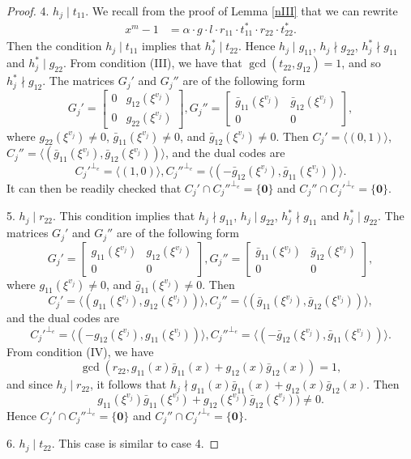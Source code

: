\documentclass[10pt,a4paper]{amsart}
\begin{document}
\begin{proof}
4. $h_j \mid t_{11}$. We recall from the proof of Lemma \ref{nIII} that we can  rewrite 
\begin{align*}
x^m-1   &= \alpha \cdot g \cdot l \cdot r_{11} \cdot t_{11}^*    \cdot  r_{22} \cdot  t_{22}^*.
\end{align*}  
Then the condition $h_j \mid t_{11}$   implies that $h_j^* \mid t_{22}$. Hence $h_j \mid g_{11}$, $h_j \nmid g_{22}$, $h_j^* \nmid g_{11}$ and $h_j^* \mid g_{22}$.  
From condition (III), we have that $\gcd(t_{22},g_{12})=1$, and so $h_j^* \nmid g_{12}$.  
The matrices $G_j'$ and  $G_j''$ are of the following form
$$
G_j'=   \begin{bmatrix}
0 & g_{12}(\xi^{v_j}) \\
0 & g_{22}(\xi^{v_j}) 
\end{bmatrix} ,
G_j''=   \begin{bmatrix}
\bar{g}_{11}(\xi^{v_j}) & \bar{g}_{12}(\xi^{v_j}) \\
0 & 0
\end{bmatrix},
$$
where $g_{22}(\xi^{v_j})\ne0$, $\bar{g}_{11}(\xi^{v_j})\ne 0$, and $\bar{g}_{12}(\xi^{v_j})\ne0$.  Then $C_j' =\langle (0,1) \rangle$, $C_j'' =\langle (\bar{g}_{11}(\xi^{v_j}),\bar{g}_{12}(\xi^{v_j})) \rangle$, and the dual codes are 
$$
C_j'^{\perp_e}  =\langle (1,0) \rangle,C_j''^{\perp_e}  =\langle (-\bar{g}_{12}(\xi^{v_j}),\bar{g}_{11}(\xi^{v_j}))\rangle.
$$ 
It can then be readily checked that $C_j' \cap C_j''^{\perp_e} = \{\mathbf{0}\}$ and $C_j'' \cap C_j'^{\perp_e} = \{\mathbf{0}\}$.

5. $h_j \mid r_{22}$. This condition implies that $h_j \nmid g_{11}$, $h_j \mid g_{22}$, $h_j^* \nmid g_{11}$ and $h_j^* \mid g_{22}$. The matrices $G_j'$ and  $G_j''$ are of the following form
$$
G_j'=   \begin{bmatrix}
g_{11}(\xi^{v_j}) & g_{12}(\xi^{v_j}) \\
0 & 0
\end{bmatrix},
G_j''=   \begin{bmatrix}
\bar{g}_{11}(\xi^{v_j}) & \bar{g}_{12}(\xi^{v_j}) \\
0 & 0
\end{bmatrix},
$$
where $g_{11}(\xi^{v_j})\ne0$, and $\bar{g}_{11}(\xi^{v_j})\ne 0$. Then 
$$C_j' =\langle (g_{11}(\xi^{v_j}), g_{12}(\xi^{v_j})) \rangle , C_j'' =\langle (\bar{g}_{11}(\xi^{v_j}), \bar{g}_{12}(\xi^{v_j})) \rangle,$$
and the dual codes are 
$$
C_j'^{\perp_e}  =\langle (-g_{12}(\xi^{v_j}),g_{11}(\xi^{v_j}))\rangle, C_j''^{\perp_e}  =\langle (-\bar{g}_{12}(\xi^{v_j}),\bar{g}_{11}(\xi^{v_j}))\rangle.
$$  
From condition (IV), we have 
$$\gcd(r_{22}, g_{11}(x)\bar{g}_{11}(x)+g_{12}(x) \bar{g}_{12}(x))=1,$$ 
and since $h_j \mid r_{22}$, it follows that $h_j \nmid g_{11}(x)\bar{g}_{11}(x)+g_{12}(x) \bar{g}_{12}(x)$. Then
$$
g_{11}(\xi^{v_j})\bar{g}_{11}(\xi^{v_j})+g_{12}(\xi^{v_j}) \bar{g}_{12}(\xi^{v_j})) \ne 0.
$$
Hence $C_j' \cap C_j''^{\perp_e} = \{\mathbf{0}\}$ and $C_j'' \cap C_j'^{\perp_e} = \{\mathbf{0}\}$.

6. $h_j \mid t_{22}$. This case is similar to case 4.  \qedhere 

\end{proof}
\end{document}
